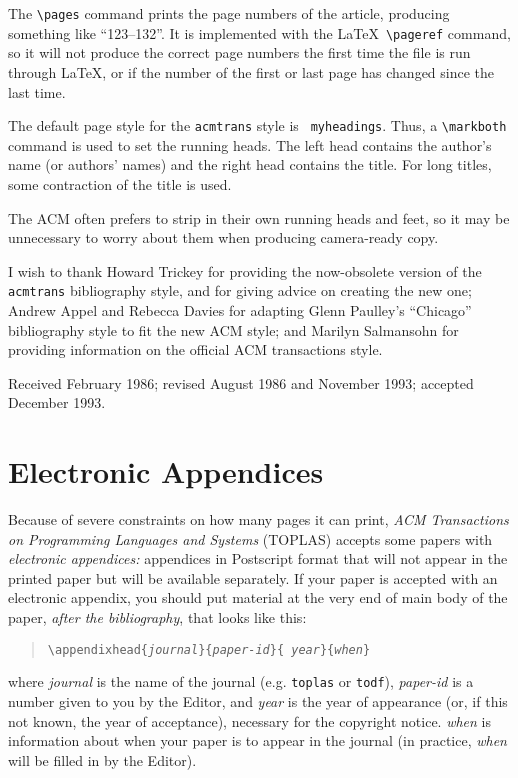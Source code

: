 The \verb|\pages| command prints the page numbers of the article,
producing something like ``123--132''.  It is implemented with the
\LaTeX\ \verb|\pageref| command, so it will not produce the correct
page numbers the first time the file is run through \LaTeX, or if the
number of the first or last page has changed since the last time.

The default page style for the {\tt acmtrans} style is {\tt
myheadings}.  Thus, a \verb|\markboth| command is used to set the
running heads.  The left head contains the author's name (or authors'
names) and the right head contains the title.  For long titles,
some contraction of the title is used.

The ACM often prefers to strip in their own running heads and
feet, so it may be unnecessary to worry about them when producing
camera-ready copy.

\begin{acks}
I wish to thank Howard Trickey for providing the now-obsolete
version of the {\tt acmtrans}
bibliography style, and for giving advice on creating the new one;
Andrew Appel and Rebecca Davies for adapting
Glenn Paulley's ``Chicago'' bibliography
style to fit the new ACM style; 
and Marilyn Salmansohn for providing information
on the official ACM transactions style.
\end{acks}



\begin{received}
Received February 1986; revised August 1986 and November 1993;
accepted December 1993.
\end{received}

\section{Electronic Appendices}
Because of severe constraints on how many pages it can print,
{\it ACM Transactions on Programming Languages and Systems} (TOPLAS)
accepts some papers with {\it electronic appendices:}  appendices
in Postscript format that will not appear in the printed paper but
will be available separately.  If your paper is accepted with an
electronic appendix, you should put material at the very end of main body
of the paper, {\it after the bibliography}, that looks like this:

\begin{quote}
{\tt \verb|\|appendixhead\{{\it journal}\}\{{\it paper-id}\}\{%
{\it year}\}\{{\it when}\}}
\end{quote}
where {\it journal} is the name of the journal (e.g. {\tt toplas} or
{\tt todf}),
{\it paper-id} is a number given to you by the Editor, and
{\it year} is the year of appearance (or, if this not known, the year
of acceptance), necessary for the copyright notice.
{\it when} is information about when your paper is to appear
in the journal (in practice, {\it when} will be filled in by
the Editor).

